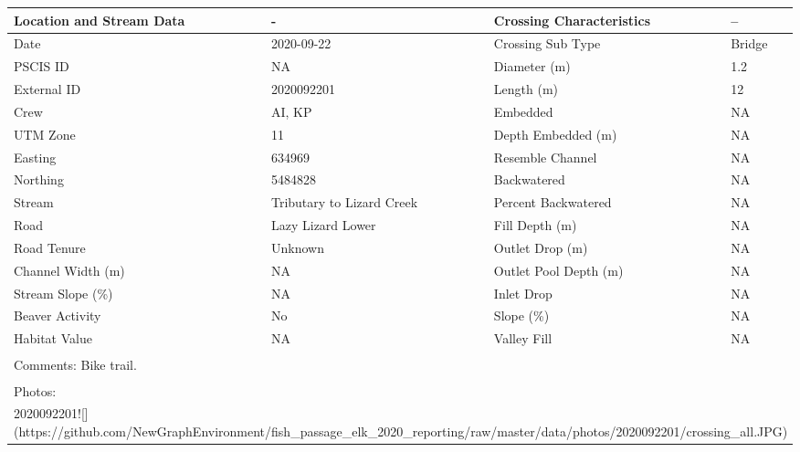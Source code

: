 \documentclass[
]{book}
\begin{document}
\begin{tabular}{l|l|l|l}
\hline
Location and Stream Data & - & Crossing Characteristics & --\\
\hline
Date & 2020-09-22 & Crossing Sub Type & Bridge\\
\hline
PSCIS ID & NA & Diameter (m) & 1.2\\
\hline
External ID & 2020092201 & Length (m) & 12\\
\hline
Crew & AI, KP & Embedded & NA\\
\hline
UTM Zone & 11 & Depth Embedded (m) & NA\\
\hline
Easting & 634969 & Resemble Channel & NA\\
\hline
Northing & 5484828 & Backwatered & NA\\
\hline
Stream & Tributary to Lizard Creek & Percent Backwatered & NA\\
\hline
Road & Lazy Lizard Lower & Fill Depth (m) & NA\\
\hline
Road Tenure & Unknown & Outlet Drop (m) & NA\\
\hline
Channel Width (m) & NA & Outlet Pool Depth (m) & NA\\
\hline
Stream Slope (\%) & NA & Inlet Drop & NA\\
\hline
Beaver Activity & No & Slope (\%) & NA\\
\hline
Habitat Value & NA & Valley Fill & NA\\
\hline
\multicolumn{4}{l}{\textsuperscript{} Comments: Bike trail.}\\
\multicolumn{4}{l}{\textsuperscript{} Photos:}\\
\multicolumn{4}{l}{2020092201![](https://github.com/NewGraphEnvironment/fish\_passage\_elk\_2020\_reporting/raw/master/data/photos/2020092201/crossing\_all.JPG)}\\
\end{tabular}
\end{document}
